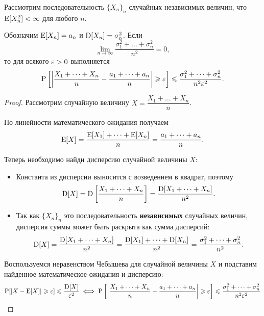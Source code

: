 \begin{theorem*}
    Рассмотрим последовательность $\{X_n\}_n$ случайных независимых величин, что $\operatorname{E}[X_n^2] < \infty$ для любого $n$.

    Обозначим $\operatorname{E}[X_n] = a_n$ и $\operatorname{D}[X_n] = \sigma_n^2$. Если
    \begin{equation*}
        \lim_{n \to \infty} \dfrac{\sigma_1^2 + \dots + \sigma_n^2}{n^2} = 0,
    \end{equation*}
    то для всякого $\varepsilon > 0$ выполняется
    \begin{equation*}
        \operatorname{P}\left[\left|\dfrac{X_1 + \dots + X_n}{n} - \dfrac{a_1 + \dots + a_n}{n}\right| \geqslant \varepsilon\right] \leqslant \dfrac{\sigma_1^2 + \dots + \sigma_n^2}{n^2 \varepsilon^2}.
    \end{equation*}
\end{theorem*}

\begin{proof}
    Рассмотрим случайную величину $X = \dfrac{X_1 + \dots + X_n}{n}$.

    По линейности математического ожидания получаем
    \begin{equation*}
        \operatorname{E}[X] = \dfrac{\operatorname{E}[X_1] + \dots + \operatorname{E}[X_n]}{n} = \dfrac{a_1 + \dots + a_n}{n}.
    \end{equation*}

    Теперь необходимо найди дисперсию случайной величины $X$:
    \begin{itemize}
    \item 
        Константа из дисперсии выносится с возведением в квадрат, поэтому
        \begin{equation*}
            \operatorname{D}[X] = \operatorname{D}\left[\dfrac{X_1 + \dots + X_n}{n}\right] = \dfrac{\operatorname{D}[X_1 + \dots + X_n]}{n^2}.
        \end{equation*}

    \item 
        Так как $\{X_n\}_n$ это последовательность \textbf{независимых} случайных величин, дисперсия суммы может быть раскрыта как сумма дисперсий:
        \begin{equation*}
            \operatorname{D}[X] = \dfrac{\operatorname{D}[X_1 + \dots + X_n]}{n^2} = \dfrac{\operatorname{D}[X_1] + \dots + \operatorname{D}[X_n]}{n^2} = \dfrac{\sigma_1^2 + \dots + \sigma_n^2}{n^2}.
        \end{equation*}
    \end{itemize}

    Воспользуемся неравенством Чебышева для случайной величины $X$ и подставим найденное математическое ожидания и дисперсию:
    \begin{equation*}
        \operatorname{P}[|X - \operatorname{E}[X]| \geqslant \varepsilon] \leqslant \dfrac{\operatorname{D}[X]}{\varepsilon^2}
        \iff \operatorname{P}\left[\left|\dfrac{X_1 + \dots + X_n}{n} - \dfrac{a_1 + \dots + a_n}{n}\right| \geqslant \varepsilon\right] \leqslant \dfrac{\sigma_1^2 + \dots + \sigma_n^2}{n^2 \varepsilon^2}
    \end{equation*}
\end{proof}

